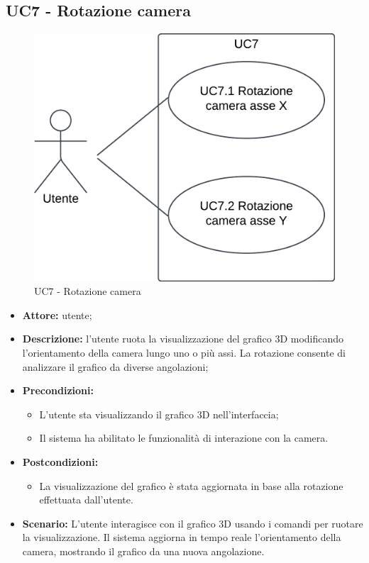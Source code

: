 \subsection{UC7 - Rotazione camera}
\begin{figure}[h!]
    \centering
    \includegraphics[scale=0.7]{template/images/UC7_7.1_7.2.png}
    \caption{UC7 - Rotazione camera}
\end{figure}
\begin{itemize}
    \item \textbf{Attore:} utente;
    \item \textbf{Descrizione:} l'utente ruota la visualizzazione del grafico 3D modificando l'orientamento della camera lungo uno o più assi. La rotazione consente di analizzare il grafico da diverse angolazioni;
    \item \textbf{Precondizioni:} 
    \begin{itemize}
        \item L'utente sta visualizzando il grafico 3D nell'interfaccia;
        \item Il sistema ha abilitato le funzionalità di interazione con la camera.
    \end{itemize}
    \item \textbf{Postcondizioni:} 
    \begin{itemize}
        \item La visualizzazione del grafico è stata aggiornata in base alla rotazione effettuata dall'utente.
    \end{itemize}
    \item \textbf{Scenario:}  
    L'utente interagisce con il grafico 3D usando i comandi per ruotare la visualizzazione. Il sistema aggiorna in tempo reale l'orientamento della camera, mostrando il grafico da una nuova angolazione.
\end{itemize}
